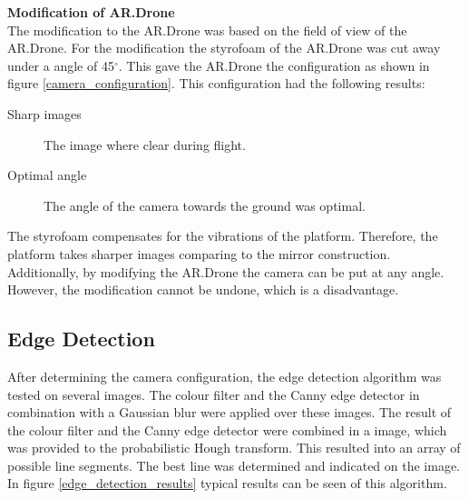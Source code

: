 \documentclass[a4paper]{article}
\begin{document}
\noindent\textbf{Modification of AR.Drone}\\
The modification to the AR.Drone was based on the field of view of the AR.Drone. For the modification the styrofoam of the AR.Drone was cut away under a angle of 45$^{\circ}$. This gave the AR.Drone the configuration as shown in figure \ref{camera_configuration}. This configuration had the following results:
\begin{description}
\item[Sharp images] The image where clear during flight.
\item[Optimal angle] The angle of the camera towards the ground was optimal.
\end{description}
The styrofoam compensates for the vibrations of the platform. Therefore, the platform takes sharper images comparing to the mirror construction. Additionally, by modifying the AR.Drone the camera can be put at any angle. However, the modification cannot be undone, which is a disadvantage.

\subsection{Edge Detection}
After determining the camera configuration, the edge detection algorithm was tested on several images. The colour filter and the Canny edge detector in combination with a Gaussian blur were applied over these images. The result of the colour filter and the Canny edge detector were combined in a image, which was provided to the probabilistic Hough transform. This resulted into an array of possible line segments. The best line was determined and indicated on the image. In figure \ref{edge_detection_results} typical results can be seen of this algorithm. 
\end{document}
